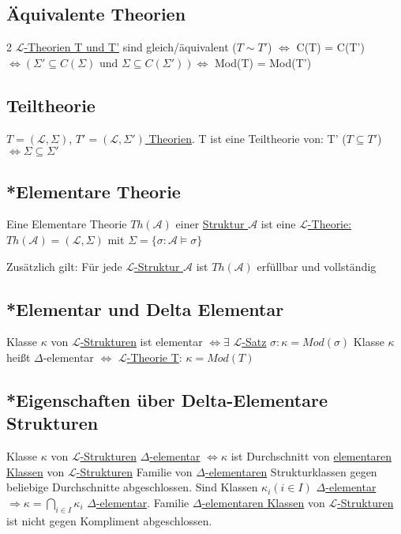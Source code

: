 \documentclass[12pt,a4paper]{article} %
\begin{document}
	\subsection{Äquivalente Theorien}
	2 \hyperref[Theorie]{$\mathcal{L}$-Theorien T und T'} sind gleich/äquivalent ($T \sim T'$) $\Leftrightarrow$ C(T) = C(T') $\Leftrightarrow (\Sigma' \subseteq C(\Sigma) \text{ und } \Sigma \subseteq C(\Sigma')) \Leftrightarrow$ Mod(T) = Mod(T')
	
	\subsection{Teiltheorie}
	$T = (\mathcal{L}, \Sigma)$, \hyperref[Theorie]{$T' = (\mathcal{L}, \Sigma')$ Theorien}. T ist eine Teiltheorie von: \newline
	T' ($T \subseteq T'$) $\Leftrightarrow \Sigma \subseteq \Sigma'$
	
	\subsection{*Elementare Theorie}
	Eine Elementare Theorie $Th(\mathcal{A})$ einer \hyperref[Struktur]{Struktur $\mathcal{A}$} ist eine \hyperref[Theorie]{$\mathcal{L}$-Theorie: $Th(\mathcal{A}) = (\mathcal{L}, \Sigma)$} mit $\Sigma = \{\sigma : \mathcal{A} \hyperref[Erfullbar]{\vDash} \sigma\}$ 
	
	Zusätzlich gilt: Für jede \hyperref[Struktur]{$\mathcal{L}$-Struktur $\mathcal{A}$} ist $Th(\mathcal{A})$ erfüllbar und vollständig
	
	\subsection{*Elementar und Delta Elementar}
	\label{Elementar}
	Klasse $\kappa$ von \hyperref[Struktur]{$\mathcal{L}$-Strukturen} ist elementar $\Leftrightarrow \exists$ \hyperref[LSatz]{$\mathcal{L}$-Satz} $\sigma: \kappa = Mod(\sigma)$ \newline
	Klasse $\kappa$ heißt $\Delta$-elementar $\Leftrightarrow$ \hyperref[Theorie]{$\mathcal{L}$-Theorie T}: $\kappa = Mod(T)$
	
	\subsection{*Eigenschaften über Delta-Elementare Strukturen}
	Klasse $\kappa$ von \hyperref[Struktur]{$\mathcal{L}$-Strukturen} \hyperref[Elementar]{$\Delta$-elementar} $\Leftrightarrow \kappa$ ist Durchschnitt von \hyperref[Elementar]{elementaren Klassen} von \hyperref[Struktur]{$\mathcal{L}$-Strukturen} \newline{}
	\newline
	Familie von \hyperref[Elementar]{$\Delta$-elementaren} Strukturklassen gegen beliebige Durchschnitte abgeschlossen. Sind Klassen $\kappa_i (i \in I)$ \hyperref[Elementar]{$\Delta$-elementar} $\Rightarrow \kappa = \bigcap\limits_{i \in I} \kappa_i$ \hyperref[Elementar]{$\Delta$-elementar}. Familie \hyperref[Elementar]{$\Delta$-elementaren Klassen} von \hyperref[Struktur]{$\mathcal{L}$-Strukturen} ist nicht gegen Kompliment abgeschlossen.
	
\end{document}
